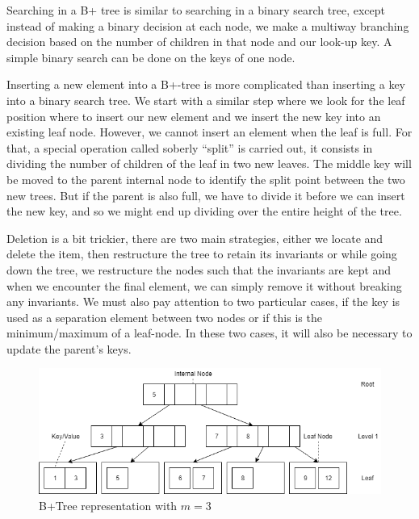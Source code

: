 Searching in a B+ tree is similar to searching in a binary search tree, except instead of making a binary decision at each node, we make a multiway branching decision based on the number of children in that node and our look-up key. A simple binary search can be done on the keys of one node.

Inserting a new element into a B+-tree is more complicated than inserting a key into a binary search tree. We start with a similar step where we look for the leaf position where to insert our new element and we insert the new key into an existing leaf node. However, we cannot insert an element when the leaf is full. For that, a special operation called soberly ``split'' is carried out, it consists in dividing the number of children of the leaf in two new leaves. The middle key will be moved to the parent internal node to identify the split point between the two new trees. But if the parent is also full, we have to divide it before we can insert the new key, and so we might end up dividing over the entire height of the tree.

Deletion is a bit trickier, there are two main strategies, either we locate and delete the item, then restructure the tree to retain its invariants or while going down the tree, we restructure the nodes such that the invariants are kept and when we encounter the final element, we can simply remove it without breaking any invariants. We must also pay attention to two particular cases, if the key is used as a separation element between two nodes or if this is the minimum/maximum of a leaf-node. In these two cases, it will also be necessary to update the parent's keys.

\begin{figure}[!ht]
\centering
\includegraphics[width=\linewidth]{Chapters/XFastTries/Implementation/BTree.png} 
\caption{B+Tree representation with $m = 3$}
\end{figure}


